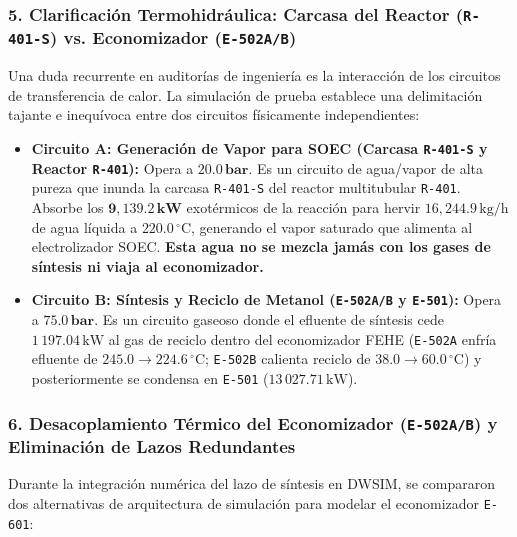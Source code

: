 \documentclass[11pt,a4paper]{article}
\begin{document}
\subsubsection{5. Clarificación Termohidráulica: Carcasa del Reactor (\texttt{R-401-S}) vs. Economizador (\texttt{E-502A/B})}
Una duda recurrente en auditorías de ingeniería es la interacción de los circuitos de transferencia de calor. La simulación de prueba establece una delimitación tajante e inequívoca entre dos circuitos físicamente independientes:
\begin{itemize}
    \item \textbf{Circuito A: Generación de Vapor para SOEC (Carcasa \texttt{R-401-S} y Reactor \texttt{R-401}):} Opera a $\mathbf{20.0\,\text{bar}}$. Es un circuito de agua/vapor de alta pureza que inunda la carcasa \texttt{R-401-S} del reactor multitubular \texttt{R-401}. Absorbe los $\mathbf{9{,}139.2\,\text{kW}}$ exotérmicos de la reacción para hervir $16{,}244.9\,\text{kg/h}$ de agua líquida a $220.0\,^\circ\text{C}$, generando el vapor saturado que alimenta al electrolizador SOEC. \textbf{Esta agua no se mezcla jamás con los gases de síntesis ni viaja al economizador.}
    \item \textbf{Circuito B: Síntesis y Reciclo de Metanol (\texttt{E-502A/B} y \texttt{E-501}):} Opera a $\mathbf{75.0\,\text{bar}}$. Es un circuito gaseoso donde el efluente de síntesis cede $1\,197.04\,\text{kW}$ al gas de reciclo dentro del economizador FEHE (\texttt{E-502A} enfría efluente de $245.0 \to 224.6\,^\circ\text{C}$; \texttt{E-502B} calienta reciclo de $38.0 \to 60.0\,^\circ\text{C}$) y posteriormente se condensa en \texttt{E-501} ($13\,027.71\,\text{kW}$).
\end{itemize}

\subsubsection{6. Desacoplamiento Térmico del Economizador (\texttt{E-502A/B}) y Eliminación de Lazos Redundantes}
Durante la integración numérica del lazo de síntesis en DWSIM, se compararon dos alternativas de arquitectura de simulación para modelar el economizador \texttt{E-601}:
\end{document}
